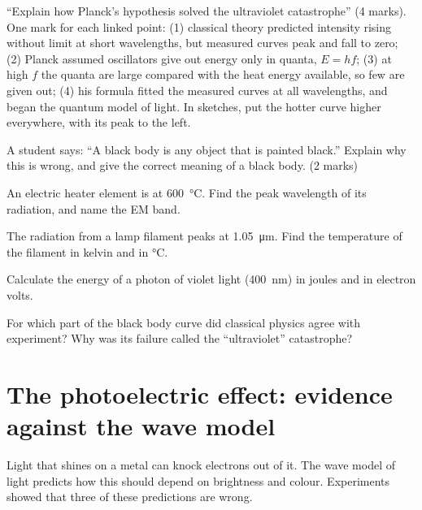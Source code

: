 \begin{examtip}
``Explain how Planck's hypothesis solved the ultraviolet catastrophe'' (4 marks).
One mark for each linked point: (1) classical theory predicted intensity rising
without limit at short wavelengths, but measured curves peak and fall to zero;
(2) Planck assumed oscillators give out energy only in quanta, $E = hf$; (3) at high
$f$ the quanta are large compared with the heat energy available, so few are given
out; (4) his formula fitted the measured curves at all wavelengths, and began the
quantum model of light. In sketches, put the hotter curve higher everywhere, with
its peak to the left.
\end{examtip}

\begin{quickcheck}
  \item A student says: ``A black body is any object that is painted black.''
        Explain why this is wrong, and give the correct meaning of a black body.
        (2 marks)\label{ch3:qc:bbdef}
  \item An electric heater element is at \qty{600}{\degreeCelsius}. Find the peak
        wavelength of its radiation, and name the EM band.
  \item The radiation from a lamp filament peaks at \qty{1.05}{\micro m}. Find the
        temperature of the filament in kelvin and in \si{\degreeCelsius}.
  \item Calculate the energy of a photon of violet light (\qty{400}{nm}) in joules
        and in electron volts.
  \item For which part of the black body curve did classical physics agree with
        experiment? Why was its failure called the ``ultraviolet''
        catastrophe?\label{ch3:qc:uvname}
\end{quickcheck}

\section{The photoelectric effect: evidence against the wave model}\label{ch3:sec:photoelectric}

\begin{bigidea}
Light that shines on a metal can knock electrons out of it. The wave model of light
predicts how this should depend on brightness and colour. Experiments showed that
three of these predictions are wrong.
\end{bigidea}

